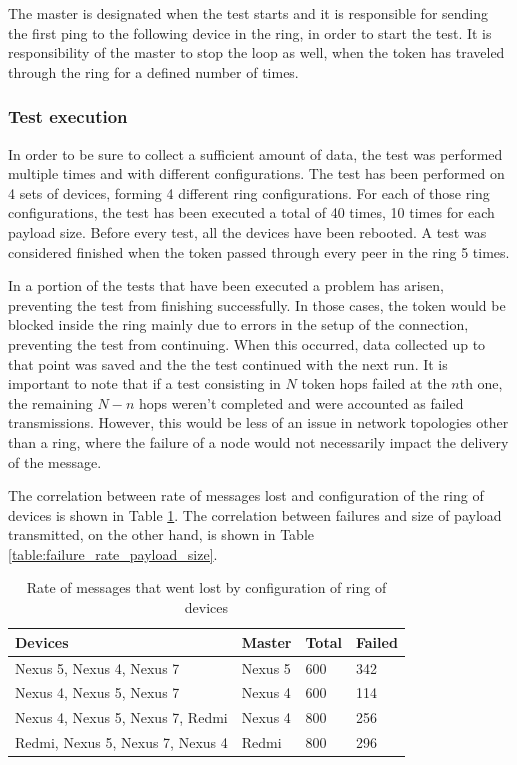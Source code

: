 The master is designated when the test starts and it is responsible for sending the first ping to the following device in the ring, in order to start the test.
It is responsibility of the master to stop the loop as well, when the token has traveled through the ring for a defined number of times.

\subsubsection{Test execution}
In order to be sure to collect a sufficient amount of data, the test was performed multiple times and with different configurations.
The test has been performed on 4 sets of devices, forming 4 different ring configurations.
For each of those ring configurations, the test has been executed a total of 40 times, 10 times for each payload size.
Before every test, all the devices have been rebooted.
A test was considered finished when the token passed through every peer in the ring 5 times.

In a portion of the tests that have been executed a problem has arisen, preventing the test from finishing successfully.
In those cases, the token would be blocked inside the ring mainly due to errors in the setup of the connection, preventing the test from continuing.
When this occurred, data collected up to that point was saved and the the test continued with the next run.
It is important to note that if a test consisting in $N$ token hops failed at the $n$th one, the remaining $N - n$ hops weren't completed and were accounted as failed transmissions.
However, this would be less of an issue in network topologies other than a ring, where the failure of a node would not necessarily impact the delivery of the message.

The correlation between rate of messages lost and configuration of the ring of devices is shown in Table \ref{table:failure_rate_ring_config}.
The correlation between failures and size of payload transmitted, on the other hand, is shown in Table \ref{table:failure_rate_payload_size}.

\begin{table}[ht]
\centering
\begin{tabular}{llll}
\hline
Devices                             & Master      & Total   &  Failed    \\ \hline
Nexus 5, Nexus 4, Nexus 7           & Nexus 5     & 600     & 342        \\
Nexus 4, Nexus 5, Nexus 7           & Nexus 4     & 600     & 114        \\
Nexus 4, Nexus 5, Nexus 7, Redmi    & Nexus 4     & 800     & 256        \\
Redmi, Nexus 5, Nexus 7, Nexus 4    & Redmi       & 800     & 296        \\
\hline
\end{tabular}
\caption{Rate of messages that went lost by configuration of ring of devices}
\label{table:failure_rate_ring_config}
\end{table}



